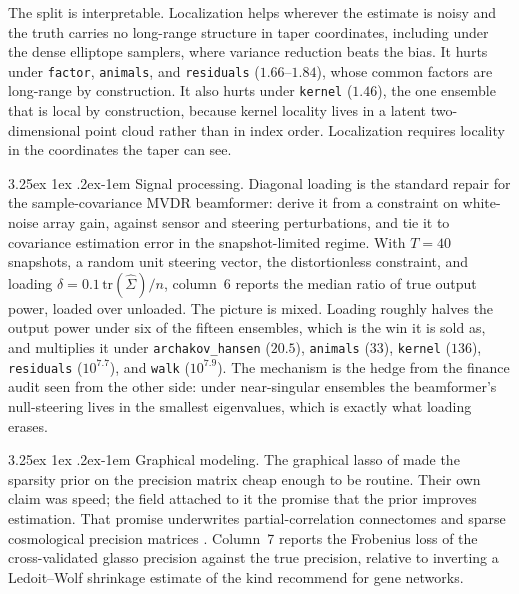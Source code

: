 \documentclass[11pt]{article}
\makeatletter
\renewcommand\paragraph{\@startsection{paragraph}{4}{\z@}%
  {3.25ex \@plus1ex \@minus.2ex}{-1em}%
  {\normalfont\normalsize\itshape}}
\renewcommand\paragraph{\@startsection{paragraph}{4}{\z@}%
  {3.25ex \@plus1ex \@minus.2ex}{-1em}%
  {\normalfont\normalsize\itshape}}
\makeatother
\begin{document}
The split is interpretable. Localization helps wherever the estimate is
noisy and the truth carries no long-range structure in taper coordinates,
including under the dense elliptope samplers, where variance reduction
beats the bias. It hurts under \texttt{factor}, \texttt{animals}, and
\texttt{residuals} ($1.66$--$1.84$), whose common factors are long-range
by construction. It also hurts under \texttt{kernel} ($1.46$), the one
ensemble that is local by construction,
because kernel locality lives in a latent two-dimensional point cloud
rather than in index order. Localization requires locality in the
coordinates the taper can see.

\paragraph{Signal processing.} Diagonal loading is the standard repair
for the sample-covariance MVDR beamformer: \citet{cox1987} derive it from a
constraint on white-noise array gain, against sensor and steering
perturbations, and \citet{carlson1988} tie it to covariance estimation error
in the snapshot-limited regime. With $T=40$ snapshots, a
random unit steering vector, the distortionless constraint, and loading
$\delta=0.1\,\mathrm{tr}(\hat\Sigma)/n$, column~6 reports the median
ratio of true output power, loaded over unloaded. The picture is mixed. Loading roughly halves the output power under six
of the fifteen ensembles, which is the win it is sold as, and multiplies
it under \texttt{archakov\_hansen} ($20.5$), \texttt{animals} ($33$),
\texttt{kernel} ($136$), \texttt{residuals} ($10^{7.7}$), and
\texttt{walk} ($10^{7.9}$). The mechanism
is the hedge from the finance audit seen from the other side: under
near-singular ensembles the beamformer's null-steering lives in the
smallest eigenvalues, which is exactly what loading erases.

\paragraph{Graphical modeling.} The graphical lasso of \citet{friedman2008} made the sparsity prior on the
precision matrix cheap enough to be routine. Their own claim was speed;
the field attached to it the promise that the prior improves estimation. That promise underwrites partial-correlation connectomes
\citep{smith2011} and sparse cosmological precision matrices
\citep{padmanabhan2016}. Column~7
reports the Frobenius loss of the cross-validated glasso precision
against the true precision, relative to inverting a Ledoit--Wolf
shrinkage estimate of the kind \citet{schafer2005} recommend for gene
networks.
\end{document}
